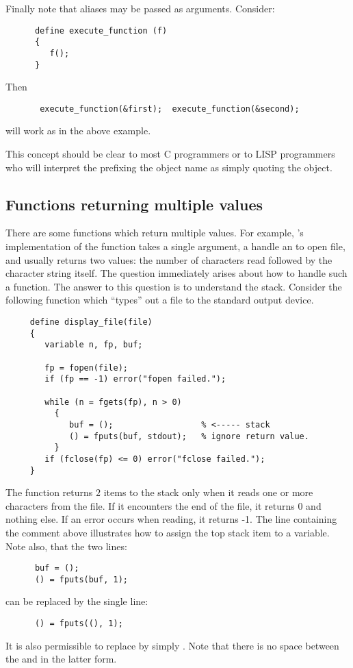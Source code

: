    Finally note that aliases may be passed as arguments.  Consider:
\begin{verbatim}
      define execute_function (f)
      {
         f();
      }
\end{verbatim}
   Then
\begin{verbatim}
       execute_function(&first);  execute_function(&second);
\end{verbatim}
   will work as in the above example.

   This concept should be clear to most C programmers or to LISP programmers
   who will interpret the \var{\&} prefixing the object name as simply
   quoting the object.


\subsection{Functions returning multiple values}

   There are some functions which return multiple values.  For example,
   \slang{}'s implementation of the  function takes a single
   argument, a handle an to open file, and usually returns two values: the
   number of characters read followed by the character string itself.  The
   question immediately arises about how to handle such a function.  The
   answer to this question is to understand the stack.  Consider the
   following function which ``types'' out a file to the standard output
   device.
\begin{verbatim}
     define display_file(file)
     {
        variable n, fp, buf;
        
        fp = fopen(file);
        if (fp == -1) error("fopen failed.");
        
        while (n = fgets(fp), n > 0)
          {
             buf = ();                  % <----- stack
             () = fputs(buf, stdout);   % ignore return value.
          }
        if (fclose(fp) <= 0) error("fclose failed.");
     }
\end{verbatim}
   The  function returns $2$ items to the stack only when it
   reads one or more characters from the file.  If it encounters the end of
   the file, it returns 0 and nothing else.  If an error occurs when
   reading, it returns -1.  The line containing the comment above
   illustrates how to assign the top stack item to a variable.  Note also,
   that the two lines:
\begin{verbatim}
      buf = ();
      () = fputs(buf, 1);
\end{verbatim}
   can be replaced by the single line:  
\begin{verbatim}
      () = fputs((), 1);
\end{verbatim}
   It is also permissible to replace  by simply .
   Note that there is no space between the \var{=} and  in the
   latter form.

